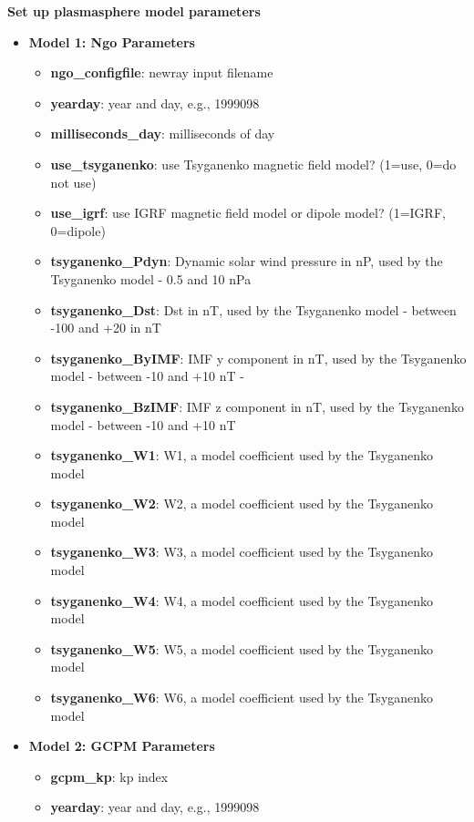 \documentclass[10pt]{article}
\begin{document}
{\bf Set up plasmasphere model parameters}
\begin{itemize}
  \item{\bf Model 1: Ngo Parameters}
    \begin{itemize}
    \item{\bf ngo\_configfile}:
      newray input filename
    \item{\bf yearday}:
      year and day, e.g., 1999098
    \item{\bf milliseconds\_day}:
      milliseconds of day
    \item{\bf use\_tsyganenko}:
      use Tsyganenko magnetic field model? (1=use, 0=do not use)
    \item{\bf use\_igrf}:
      use IGRF magnetic field model or dipole model? (1=IGRF, 0=dipole)
    \item{\bf tsyganenko\_Pdyn}:
      Dynamic solar wind pressure in nP, used by the Tsyganenko model
      - 0.5 and 10 nPa
    \item{\bf tsyganenko\_Dst}:
      Dst in nT, used by the Tsyganenko model - between -100 and +20 in nT
    \item{\bf tsyganenko\_ByIMF}:
      IMF y component in nT, used by the Tsyganenko model - between
      -10 and +10 nT -
    \item{\bf tsyganenko\_BzIMF}:
      IMF z component in nT, used by the Tsyganenko model - between
      -10 and +10 nT
    \item{\bf tsyganenko\_W1}:
      W1, a model coefficient used by the Tsyganenko model
    \item{\bf tsyganenko\_W2}:
      W2, a model coefficient used by the Tsyganenko model
    \item{\bf tsyganenko\_W3}:
      W3, a model coefficient used by the Tsyganenko model
    \item{\bf tsyganenko\_W4}:
      W4, a model coefficient used by the Tsyganenko model
    \item{\bf tsyganenko\_W5}:
      W5, a model coefficient used by the Tsyganenko model
    \item{\bf tsyganenko\_W6}:
      W6, a model coefficient used by the Tsyganenko model
    \end{itemize}
  \item{\bf Model 2:  GCPM Parameters}
    \begin{itemize}
    \item{\bf gcpm\_kp}:
      kp index
    \item{\bf yearday}:
      year and day, e.g., 1999098

\end{itemize}
\end{itemize}
\end{document}
